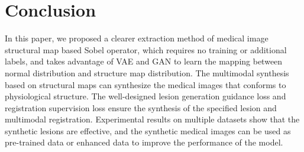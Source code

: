 \documentclass[runningheads]{llncs}
\begin{document}
	\section{Conclusion}
	In this paper, we proposed a clearer extraction method of medical image structural map based Sobel operator, which requires no training or additional labels, and takes advantage of VAE and GAN to learn the mapping between normal distribution and structure map distribution. The multimodal synthesis based on structural maps can synthesize the medical images that conforms to physiological structure. The well-designed lesion generation guidance loss and registration supervision loss ensure the synthesis of the specified lesion and multimodal registration. Experimental results on multiple datasets show that the synthetic lesions are effective, and the synthetic medical images can be used as pre-trained data or enhanced data to improve the performance of the model.
	
		
\end{document}

